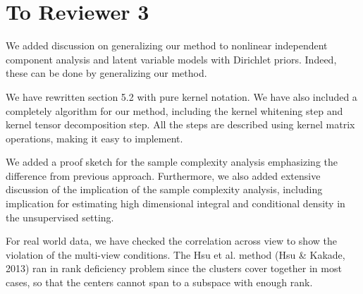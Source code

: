 \documentclass{article}
\begin{document}
\section*{To Reviewer 3}

We added discussion on generalizing our method to nonlinear independent component analysis and latent variable models with Dirichlet priors. Indeed, these can be done by generalizing our method.

We have rewritten section 5.2 with pure kernel notation.
We have also included a completely algorithm for our method, including the kernel whitening step and kernel tensor decomposition step. All the steps are described using kernel matrix operations, making it easy to implement.

We added a proof sketch for the sample complexity analysis emphasizing the difference from previous approach. Furthermore, we also added extensive discussion of the implication of the sample complexity analysis, including implication for estimating high dimensional integral and conditional density in the unsupervised setting.

For real world data, we have checked the correlation across view to show the violation of the multi-view conditions. The Hsu et al. method (Hsu \& Kakade, 2013) ran in rank deficiency problem since the clusters cover together in most cases, so that the centers cannot span to a subspace with enough rank.
\end{document}
